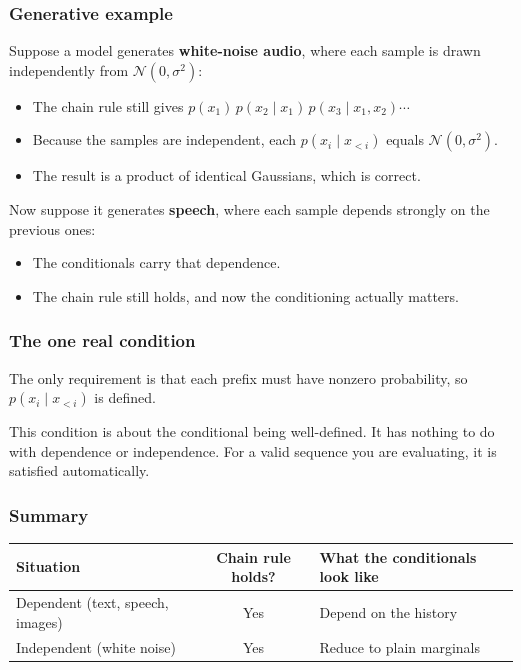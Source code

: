 \subsubsection*{Generative example}

Suppose a model generates \textbf{white-noise audio}, where each sample is drawn independently from $\mathcal{N}(0, \sigma^2)$:
\begin{itemize}
  \item The chain rule still gives $p(x_1)\,p(x_2 \mid x_1)\,p(x_3 \mid x_1, x_2)\cdots$
  \item Because the samples are independent, each $p(x_i \mid x_{<i})$ equals $\mathcal{N}(0, \sigma^2)$.
  \item The result is a product of identical Gaussians, which is correct.
\end{itemize}

Now suppose it generates \textbf{speech}, where each sample depends strongly on the previous ones:
\begin{itemize}
  \item The conditionals carry that dependence.
  \item The chain rule still holds, and now the conditioning actually matters.
\end{itemize}

\subsubsection*{The one real condition}

The only requirement is that each prefix must have nonzero probability, so $p(x_i \mid x_{<i})$ is defined.

This condition is about the conditional being well-defined. It has nothing to do with dependence or independence. For a valid sequence you are evaluating, it is satisfied automatically.

\subsubsection*{Summary}

\begin{center}
\begin{tabular}{l c l}
\toprule
Situation & Chain rule holds? & What the conditionals look like \\
\midrule
Dependent (text, speech, images) & Yes & Depend on the history \\
Independent (white noise) & Yes & Reduce to plain marginals \\
\bottomrule
\end{tabular}
\end{center}


